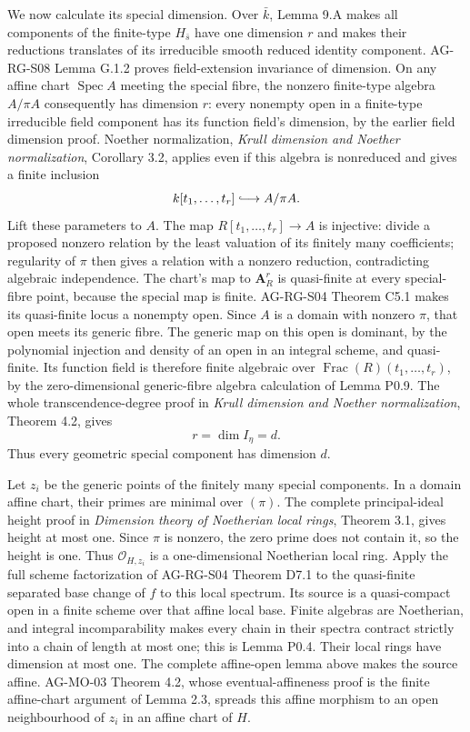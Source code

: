 \documentclass[11pt,a4paper,openany]{report}
\newcounter{none}
\begin{document}
We now calculate its special dimension. Over \(\bar k\), Lemma 9.A makes all components of the finite-type \(H_{\bar s}\) have one dimension \(r\) and makes their reductions translates of its irreducible smooth reduced identity component. AG-RG-S08 Lemma G.1.2 proves field-extension invariance of dimension. On any affine chart \(\operatorname{Spec}A\) meeting the special fibre, the nonzero finite-type algebra \(A/\pi A\) consequently has dimension \(r\): every nonempty open in a finite-type irreducible field component has its function field's dimension, by the earlier field dimension proof. Noether normalization, \emph{Krull dimension and Noether normalization}, Corollary 3.2, applies even if this algebra is nonreduced and gives a finite inclusion \[
 k[t_1,\ldots,t_r]\lhook\joinrel\longrightarrow A/\pi A.
\] Lift these parameters to \(A\). The map \(R[t_1,\ldots,t_r]\to A\) is injective: divide a proposed nonzero relation by the least valuation of its finitely many coefficients; regularity of \(\pi\) then gives a relation with a nonzero reduction, contradicting algebraic independence. The chart's map to \(\mathbf A_R^r\) is quasi-finite at every special-fibre point, because the special map is finite. AG-RG-S04 Theorem C5.1 makes its quasi-finite locus a nonempty open. Since \(A\) is a domain with nonzero \(\pi\), that open meets its generic fibre. The generic map on this open is dominant, by the polynomial injection and density of an open in an integral scheme, and quasi-finite. Its function field is therefore finite algebraic over \(\operatorname{Frac}(R)(t_1,\ldots,t_r)\), by the zero-dimensional generic-fibre algebra calculation of Lemma P0.9. The whole transcendence-degree proof in \emph{Krull dimension and Noether normalization}, Theorem 4.2, gives \[
 r=\dim I_\eta=d.
\] Thus every geometric special component has dimension \(d\).

Let \(z_i\) be the generic points of the finitely many special components. In a domain affine chart, their primes are minimal over \((\pi)\). The complete principal-ideal height proof in \emph{Dimension theory of Noetherian local rings}, Theorem 3.1, gives height at most one. Since \(\pi\) is nonzero, the zero prime does not contain it, so the height is one. Thus \(\mathcal O_{H,z_i}\) is a one-dimensional Noetherian local ring. Apply the full scheme factorization of AG-RG-S04 Theorem D7.1 to the quasi-finite separated base change of \(f\) to this local spectrum. Its source is a quasi-compact open in a finite scheme over that affine local base. Finite algebras are Noetherian, and integral incomparability makes every chain in their spectra contract strictly into a chain of length at most one; this is Lemma P0.4. Their local rings have dimension at most one. The complete affine-open lemma above makes the source affine. AG-MO-03 Theorem 4.2, whose eventual-affineness proof is the finite affine-chart argument of Lemma 2.3, spreads this affine morphism to an open neighbourhood of \(z_i\) in an affine chart of \(H\).
\end{document}
